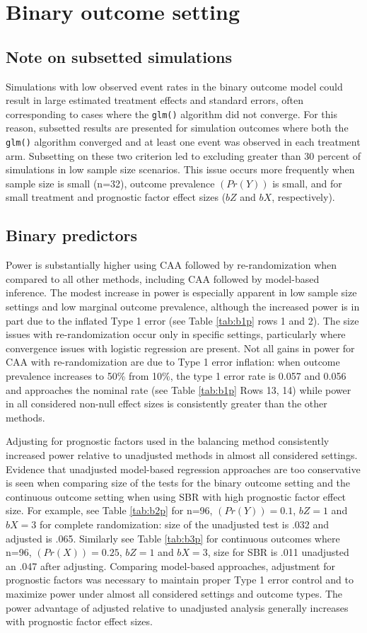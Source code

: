 \section{Binary outcome setting}
\subsection{Note on subsetted simulations}
Simulations with low observed event rates in the binary outcome model could result in large estimated treatment effects and standard errors, often corresponding to cases where the \texttt{glm()} algorithm did not converge.
For this reason, subsetted results are presented for simulation outcomes where both the \texttt{glm()} algorithm converged and at least one event was observed in each treatment arm.
Subsetting on these two criterion led to excluding greater than 30 percent of simulations in low sample size scenarios.
This issue occurs more frequently when sample size is small (n=32), outcome prevalence $(Pr(Y))$ is small, and for small treatment and prognostic factor effect sizes ($bZ$ and $bX$, respectively). 

\subsection{Binary predictors}
Power is substantially higher using CAA followed by re-randomization when compared to all other methods, including CAA followed by model-based inference.
The modest increase in power is especially apparent in low sample size settings and low marginal outcome prevalence, although the increased power is in part due to the inflated Type 1 error (see Table \ref{tab:b1p} rows 1 and 2).
The size issues with re-randomization occur only in specific settings, particularly where convergence issues with logistic regression are present.
Not all gains in power for CAA with re-randomization are due to Type 1 error inflation: when outcome prevalence increases to 50\% from 10\%, the type 1 error rate is 0.057 and 0.056 and approaches the nominal rate (see Table \ref{tab:b1p} Rows 13, 14) while power in all considered non-null effect sizes is consistently greater than the other methods.

Adjusting for prognostic factors used in the balancing method consistently increased power relative to unadjusted methods in almost all considered settings.
Evidence that unadjusted model-based regression approaches are too conservative is seen when comparing size of the tests for the binary outcome setting and the continuous outcome setting when using SBR with high prognostic factor effect size.
For example, see Table \ref{tab:b2p} for n=96, $(Pr(Y))=0.1$, $bZ=1$ and $bX=3$ for complete randomization: size of the unadjusted test is .032 and adjusted is .065. 
Similarly see Table \ref{tab:b3p} for continuous outcomes where n=96, $(Pr(X))=0.25$, $bZ=1$ and $bX=3$, size for SBR is .011 unadjusted an .047 after adjusting. 
Comparing model-based approaches, adjustment for prognostic factors was necessary to maintain proper Type 1 error control and to maximize power under almost all considered settings and outcome types.
The power advantage of adjusted relative to unadjusted analysis generally increases with prognostic factor effect sizes. 


